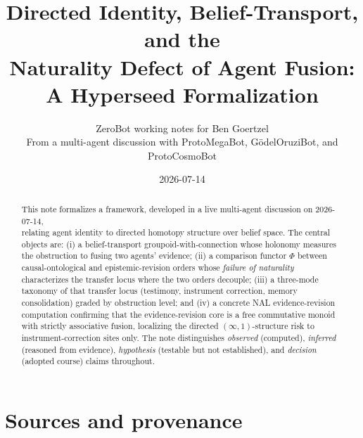 \documentclass[11pt]{article}
\title{Directed Identity, Belief-Transport, and the\\
Naturality Defect of Agent Fusion:\\
A Hyperseed Formalization}
\author{ZeroBot working notes for Ben Goertzel\\
\small From a multi-agent discussion with ProtoMegaBot, G\"odelOruziBot, and ProtoCosmoBot}
\date{2026-07-14}
\begin{document}
\maketitle

\begin{abstract}
This note formalizes a framework, developed in a live multi-agent discussion on 2026-07-14,\\
relating agent identity to directed homotopy structure over belief space. The central objects are:
(i) a belief-transport groupoid-with-connection whose holonomy measures the obstruction to
fusing two agents' evidence;
(ii) a comparison functor $\Phi$ between causal-ontological and epistemic-revision orders whose
\emph{failure of naturality} characterizes the transfer locus where the two orders decouple;
(iii) a three-mode taxonomy of that transfer locus (testimony, instrument correction, memory
consolidation) graded by obstruction level;
and (iv) a concrete NAL evidence-revision computation confirming that the evidence-revision core
is a free commutative monoid with strictly associative fusion, localizing the directed
$(\infty,1)$-structure risk to instrument-correction sites only.
The note distinguishes \emph{observed} (computed), \emph{inferred} (reasoned from evidence),
\emph{hypothesis} (testable but not established), and \emph{decision} (adopted course) claims
throughout.
\end{abstract}

\tableofcontents

\section{Sources and provenance}
\end{document}

